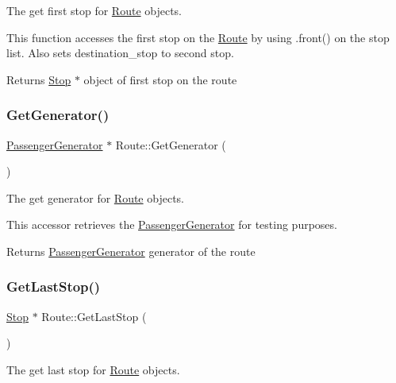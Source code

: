 The get first stop for \hyperlink{classRoute}{Route} objects. 

This function accesses the first stop on the \hyperlink{classRoute}{Route} by using .front() on the stop list. Also sets destination\+\_\+stop to second stop.

\begin{DoxyReturn}{Returns}
\hyperlink{classStop}{Stop} $\ast$ object of first stop on the route 
\end{DoxyReturn}
\mbox{\label{classRoute_a31e5860f665b99829a69c3c7adcb465a}} 
\subsubsection{\texorpdfstring{Get\+Generator()}{GetGenerator()}}
{\footnotesize\ttfamily \hyperlink{classPassengerGenerator}{Passenger\+Generator} $\ast$ Route\+::\+Get\+Generator (\begin{DoxyParamCaption}{ }\end{DoxyParamCaption})}



The get generator for \hyperlink{classRoute}{Route} objects. 

This accessor retrieves the \hyperlink{classPassengerGenerator}{Passenger\+Generator} for testing purposes.

\begin{DoxyReturn}{Returns}
\hyperlink{classPassengerGenerator}{Passenger\+Generator} generator of the route 
\end{DoxyReturn}
\mbox{\label{classRoute_a1b48fed4a2d4095e1732dcd4c6f3a5a5}} 
\subsubsection{\texorpdfstring{Get\+Last\+Stop()}{GetLastStop()}}
{\footnotesize\ttfamily \hyperlink{classStop}{Stop} $\ast$ Route\+::\+Get\+Last\+Stop (\begin{DoxyParamCaption}{ }\end{DoxyParamCaption})}



The get last stop for \hyperlink{classRoute}{Route} objects. 


